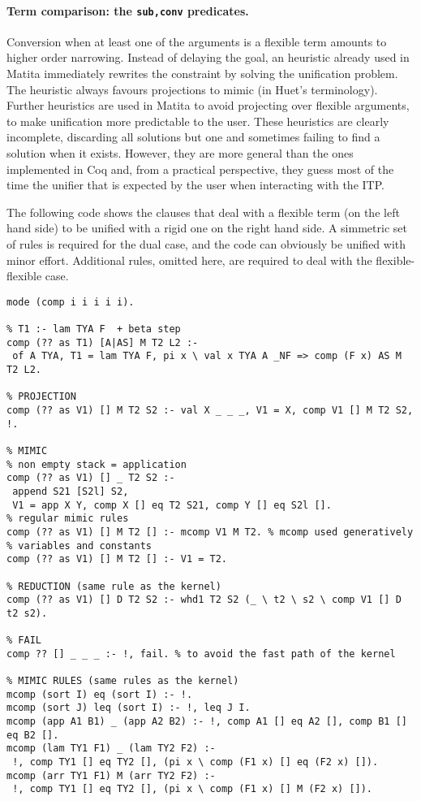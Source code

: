 \documentclass{easychair}
\begin{document}
\paragraph{Term comparison: the \texttt{sub,conv} predicates.}

Conversion when at least one of the arguments is a flexible term amounts to higher order narrowing. Instead of delaying the goal, an heuristic already used in Matita immediately rewrites the constraint by solving the unification problem. The heuristic always favours projections to mimic (in Huet's terminology). Further heuristics are used in Matita to avoid projecting over flexible arguments, to make unification more predictable to the user. These heuristics are clearly incomplete, discarding all solutions but one and sometimes failing to find a solution when it exists. However, they are more general than the ones implemented in Coq and, from a practical perspective, they guess most of the time the unifier that is expected by the user when interacting with the ITP.

The following code shows the clauses that deal with a flexible term (on the left hand side) to be unified with a rigid one on the right hand side. A simmetric set of rules is required for the dual case, and the code can obviously be unified with minor effort. Additional rules, omitted here, are required to deal with the flexible-flexible case.

\begin{Verbatim}
mode (comp i i i i i).

% T1 :- lam TYA F  + beta step
comp (?? as T1) [A|AS] M T2 L2 :-
 of A TYA, T1 = lam TYA F, pi x \ val x TYA A _NF => comp (F x) AS M T2 L2.

% PROJECTION
comp (?? as V1) [] M T2 S2 :- val X _ _ _, V1 = X, comp V1 [] M T2 S2, !.

% MIMIC
% non empty stack = application
comp (?? as V1) [] _ T2 S2 :-
 append S21 [S2l] S2,
 V1 = app X Y, comp X [] eq T2 S21, comp Y [] eq S2l [].
% regular mimic rules
comp (?? as V1) [] M T2 [] :- mcomp V1 M T2. % mcomp used generatively
% variables and constants
comp (?? as V1) [] M T2 [] :- V1 = T2.

% REDUCTION (same rule as the kernel)
comp (?? as V1) [] D T2 S2 :- whd1 T2 S2 (_ \ t2 \ s2 \ comp V1 [] D t2 s2).

% FAIL
comp ?? [] _ _ _ :- !, fail. % to avoid the fast path of the kernel

% MIMIC RULES (same rules as the kernel)
mcomp (sort I) eq (sort I) :- !.
mcomp (sort J) leq (sort I) :- !, leq J I.
mcomp (app A1 B1) _ (app A2 B2) :- !, comp A1 [] eq A2 [], comp B1 [] eq B2 [].
mcomp (lam TY1 F1) _ (lam TY2 F2) :-
 !, comp TY1 [] eq TY2 [], (pi x \ comp (F1 x) [] eq (F2 x) []).
mcomp (arr TY1 F1) M (arr TY2 F2) :-
 !, comp TY1 [] eq TY2 [], (pi x \ comp (F1 x) [] M (F2 x) []).
\end{Verbatim}
\end{document}
